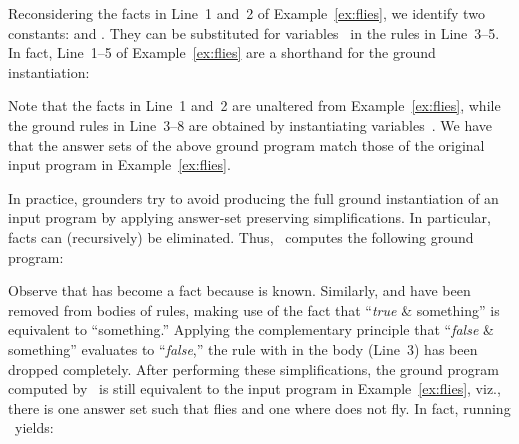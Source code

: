 \begin{example}\label{ex:flies:ground}
Reconsidering the facts in Line~1 and~2 of Example~\ref{ex:flies},
we identify two constants:  and .
They can be substituted for variables~ in the rules in Line~3--5.
In fact, Line~1--5 of Example~\ref{ex:flies} are a shorthand for the ground instantiation:
%


%
Note that the facts in Line~1 and~2 are unaltered from Example~\ref{ex:flies},
while the ground rules in Line~3--8 are obtained by instantiating variables~.
We have that the answer sets of the above ground program match
those of the original input program in Example~\ref{ex:flies}.

In practice, grounders try to avoid producing the full ground instantiation
of an input program by applying answer-set preserving simplifications.
In particular, facts can (recursively) be eliminated.
Thus, \gringo\ computes the following ground program:%
%


%
Observe that  has become a fact because
 is known.
Similarly,  and 
have been removed from bodies of rules, making use of the fact that ``\textit{true} \& something'' is
equivalent to ``something.''
Applying the complementary principle that ``\textit{false} \& something'' evaluates to ``\textit{false},''
the rule with  in the body (Line~3) has been dropped completely.
After performing these simplifications, the ground program computed by \gringo\ is still
equivalent to the input program in Example~\ref{ex:flies}, viz.,
there is one answer set such that  flies and one where  does not fly.
In fact, running \clasp\ yields:%
\end{example}
